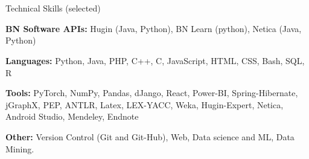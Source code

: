 \section{\faList}{Technical Skills (selected)}

\textbf{BN Software APIs:} Hugin (Java, Python), BN Learn (python), Netica (Java, Python)

\noindent\textbf{Languages:} Python, Java, PHP, C++, C, JavaScript, HTML, CSS, Bash, SQL, R

\noindent\textbf{Tools:} PyTorch, NumPy, Pandas, dJango, React, Power-BI, Spring-Hibernate, jGraphX, PEP, ANTLR, Latex, LEX-YACC, Weka, Hugin-Expert, Netica, Android Studio, Mendeley, Endnote

\noindent\textbf{Other:} Version Control (Git and Git-Hub), Web, Data science and ML, Data Mining.